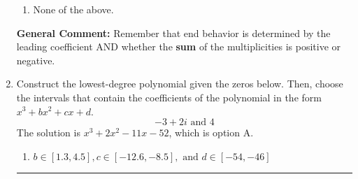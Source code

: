 \documentclass{extbook}[14pt]
\newcommand{\litem}[1]{\item #1

\rule{\textwidth}{0.4pt}}
\begin{document}
\begin{enumerate}
{\begin{center}
\end{center}\begin{enumerate}[label=\Alph*.]
\item None of the above.\end{enumerate}
\textbf{General Comment:} Remember that end behavior is determined by the leading coefficient AND whether the \textbf{sum} of the multiplicities is positive or negative.
}
\litem{
Construct the lowest-degree polynomial given the zeros below. Then, choose the intervals that contain the coefficients of the polynomial in the form $x^3+bx^2+cx+d$.
\[ -3 + 2 i \text{ and } 4 \]The solution is \( x^{3} +2 x^{2} -11 x -52 \), which is option A.\begin{enumerate}[label=\Alph*.]
\item \( b \in [1.3, 4.5], c \in [-12.6, -8.5], \text{ and } d \in [-54, -46] \)


\end{enumerate}}
\end{enumerate}
\end{document}
